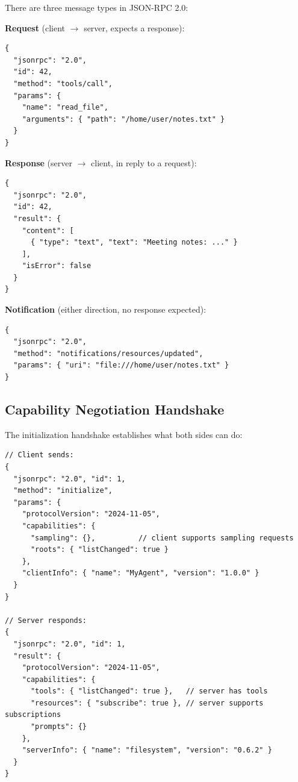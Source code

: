 There are three message types in JSON-RPC 2.0:

\textbf{Request} (client $\to$ server, expects a response):

\begin{lstlisting}[style=pythonstyle]
{
  "jsonrpc": "2.0",
  "id": 42,
  "method": "tools/call",
  "params": {
    "name": "read_file",
    "arguments": { "path": "/home/user/notes.txt" }
  }
}
\end{lstlisting}

\textbf{Response} (server $\to$ client, in reply to a request):

\begin{lstlisting}[style=pythonstyle]
{
  "jsonrpc": "2.0",
  "id": 42,
  "result": {
    "content": [
      { "type": "text", "text": "Meeting notes: ..." }
    ],
    "isError": false
  }
}
\end{lstlisting}

\textbf{Notification} (either direction, no response expected):

\begin{lstlisting}[style=pythonstyle]
{
  "jsonrpc": "2.0",
  "method": "notifications/resources/updated",
  "params": { "uri": "file:///home/user/notes.txt" }
}
\end{lstlisting}

\subsection{Capability Negotiation Handshake}
\label{capability-negotiation-handshake}

The initialization handshake establishes what both sides can do:

\begin{lstlisting}[style=pythonstyle]
// Client sends:
{
  "jsonrpc": "2.0", "id": 1,
  "method": "initialize",
  "params": {
    "protocolVersion": "2024-11-05",
    "capabilities": {
      "sampling": {},          // client supports sampling requests
      "roots": { "listChanged": true }
    },
    "clientInfo": { "name": "MyAgent", "version": "1.0.0" }
  }
}

// Server responds:
{
  "jsonrpc": "2.0", "id": 1,
  "result": {
    "protocolVersion": "2024-11-05",
    "capabilities": {
      "tools": { "listChanged": true },   // server has tools
      "resources": { "subscribe": true }, // server supports subscriptions
      "prompts": {}
    },
    "serverInfo": { "name": "filesystem", "version": "0.6.2" }
  }
}
\end{lstlisting}


